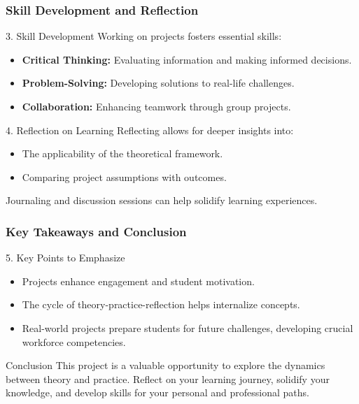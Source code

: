 \documentclass[aspectratio=169]{beamer}
\begin{document}
\begin{frame}[fragile]
    \frametitle{Skill Development and Reflection}
    \begin{block}{3. Skill Development}
        Working on projects fosters essential skills:
        \begin{itemize}
            \item \textbf{Critical Thinking:} Evaluating information and making informed decisions.
            \item \textbf{Problem-Solving:} Developing solutions to real-life challenges.
            \item \textbf{Collaboration:} Enhancing teamwork through group projects.
        \end{itemize}
    \end{block}
    
    \begin{block}{4. Reflection on Learning}
        Reflecting allows for deeper insights into:
        \begin{itemize}
            \item The applicability of the theoretical framework.
            \item Comparing project assumptions with outcomes.
        \end{itemize}
        Journaling and discussion sessions can help solidify learning experiences.
    \end{block}
\end{frame}

\begin{frame}[fragile]
    \frametitle{Key Takeaways and Conclusion}
    \begin{block}{5. Key Points to Emphasize}
        \begin{itemize}
            \item Projects enhance engagement and student motivation.
            \item The cycle of theory-practice-reflection helps internalize concepts.
            \item Real-world projects prepare students for future challenges, developing crucial workforce competencies.
        \end{itemize}
    \end{block}
    
    \begin{block}{Conclusion}
        This project is a valuable opportunity to explore the dynamics between theory and practice. Reflect on your learning journey, solidify your knowledge, and develop skills for your personal and professional paths.
    \end{block}
\end{frame}
\end{document}
